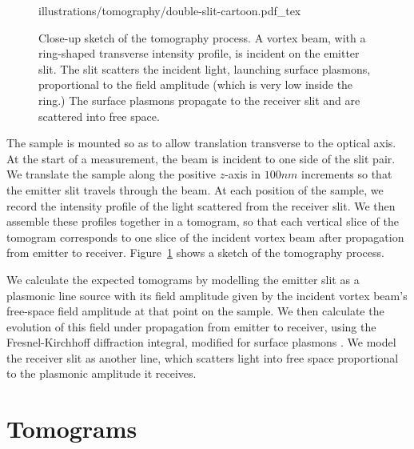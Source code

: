 \begin{figure}[tb]
\forceversofloat\centering
{illustrations/tomography/double-slit-cartoon.pdf_tex}
\caption{Close-up sketch of the tomography process.
A vortex beam, with a ring-shaped transverse intensity profile, is incident on the emitter slit.
The slit scatters the incident light, launching surface plasmons, proportional to the field amplitude (which is very low inside the ring.)
The surface plasmons propagate to the receiver slit and are scattered into free space.}
\label{tomography:fig:cartoon}
\end{figure}
%
The sample is mounted so as to allow translation transverse to the optical axis. At the start of a measurement, the beam is incident to one side of the slit pair. We translate the sample along the positive $z$-axis in $100\unit{nm}$ increments so that the emitter slit travels through the beam. At each position of the sample, we record the intensity profile of the light scattered from the receiver slit. We then assemble these profiles together in a tomogram, so that each vertical slice of the tomogram corresponds to one slice of the incident vortex beam after propagation from emitter to receiver.
Figure~\ref{tomography:fig:cartoon} shows a sketch of the tomography process.

We calculate the expected tomograms by modelling the emitter slit as a plasmonic line source with its field amplitude given by the incident vortex beam's free-space field amplitude at that point on the sample. We then calculate the evolution of this field under propagation from emitter to receiver, using the Fresnel-Kirchhoff diffraction integral, modified for surface plasmons \cite{Teperik2009}. We model the receiver slit as another line, which scatters light into free space proportional to the plasmonic amplitude it receives.

\section{Tomograms}

